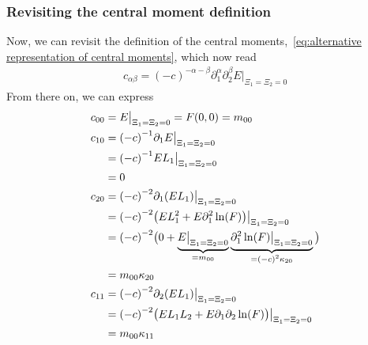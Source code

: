 \documentclass{article}
\begin{document}
\subsubsection{Revisiting the central moment definition}
\label{subs:Revisiting the central moment definition}
Now, we can revisit the definition of the central moments,~\eqref{eq:alternative representation of central moments}, which now read
\begin{equation}
  \begin{aligned}
    c_{\alpha\beta}= {(-c)}^{-\alpha-\beta} \partial_1^\alpha \partial_2^\beta E\bigr|_{\Xi_1=\Xi_2 = 0}
  \end{aligned}
\end{equation}
%
From there on, we can express
\begin{align*}
  \phantom{c_{00}}
  &\begin{aligned}
  \nonumber
    \mathllap{c_{00}} & = E\bigr|_{\Xi_1=\Xi_2 = 0} = F(0,0) = m_{00}
  \end{aligned}\\
  &\begin{aligned}
  \nonumber
    \mathllap{c_{10}} & = {(-c)}^{-1} \partial_1 E  \bigr|_{\Xi_1=\Xi_2 = 0} \\
    & = {(-c)}^{-1} EL_1  \bigr|_{\Xi_1=\Xi_2 = 0} \\
    & = 0
  \end{aligned}\\
  &\begin{aligned}
  \nonumber
    \mathllap{c_{20}} & = {(-c)}^{-2} \partial_1 (EL_1)  \bigr|_{\Xi_1=\Xi_2 = 0} \\
    & = {(-c)}^{-2} \big( EL_1^2 + E \partial_1^2\ln(F)\big)  \bigr|_{\Xi_1=\Xi_2 = 0} \\
    & = {(-c)}^{-2} \big( 0 + \underbrace{E \bigr|_{\Xi_1=\Xi_2 = 0}}_{=m_{00}}
    \underbrace{\partial_1^2\ln(F) \bigr|_{\Xi_1=\Xi_2 = 0}}_{={(-c)}^{2}\kappa_{20}} \big) \\
    & = m_{00}\kappa_{20}
  \end{aligned}\\
  &\begin{aligned}
  \nonumber
    \mathllap{c_{11}} & = {(-c)}^{-2} \partial_2 (EL_1) \bigr|_{\Xi_1=\Xi_2 = 0} \\
    & = {(-c)}^{-2} \big( E L_1 L_2 + E \partial_1\partial_2\ln(F) \big)  \bigr|_{\Xi_1=\Xi_2 = 0} \\
    & = m_{00}\kappa_{11}
  \end{aligned}\\

\end{align*}
\end{document}

